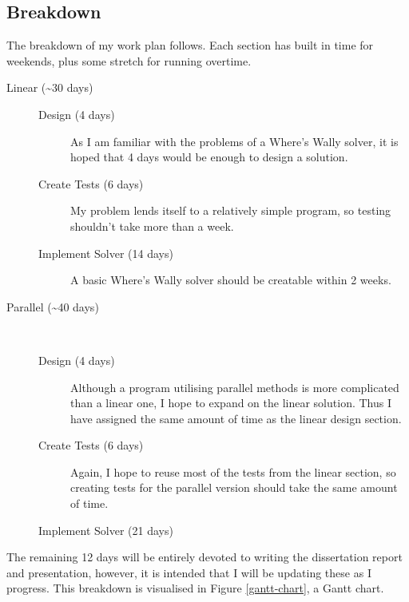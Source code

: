 \documentclass[main.tex]{subfiles}
\begin{document}
  \subsection{Breakdown}
    The breakdown of my work plan follows.
    Each section has built in time for weekends, plus some stretch for running overtime.
    \begin{description}
      \item[Linear (\textasciitilde30 days)]\hfill
        \begin{description}
          \item[Design (4 days)] As I am familiar with the problems of a Where's Wally solver, it is hoped that 4 days would be enough to design a solution.
          \item[Create Tests (6 days)] My problem lends itself to a relatively simple program, so testing shouldn't take more than a week.
          \item[Implement Solver (14 days)] A basic Where's Wally solver should be creatable within 2 weeks.
        \end{description}
      \item[Parallel (\textasciitilde40 days)]\hfill\\
        \begin{description}
          \item[Design (4 days)] Although a program utilising parallel methods is more complicated than a linear one, I hope to expand on the linear solution.
            Thus I have assigned the same amount of time as the linear design section.
          \item[Create Tests (6 days)] Again, I hope to reuse most of the tests from the linear section, so creating tests for the parallel version should take the same amount of time.
          \item[Implement Solver (21 days)] 
        \end{description}
    \end{description}
    The remaining 12 days will be entirely devoted to writing the dissertation report and presentation, however, it is intended that I will be updating these as I progress.
    This breakdown is visualised in Figure \ref{gantt-chart}, a Gantt chart.
    
    
    \biblio
\end{document}
